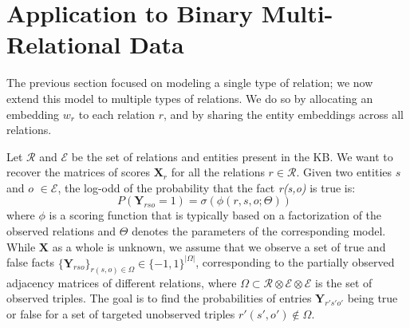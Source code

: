 \documentclass{article}
\newcommand{\OmegaSpace}{\Omega}
\newcommand{\proba}{P}
\renewcommand{\Re}{\mathbb{R}}
\newcommand{\R}{\Re} %
\newcommand{\Relation}{\mathbf{X}}
\newcommand{\ObsTensor}{\mathbf{Y}}
\newcommand{\EntitySpace}{\mathcal{E}}
\newcommand{\RelationSpace}{\mathcal{R}}
\newcommand{\Johans}[1]{\todo[inline,backgroundcolor=green!20!green]{Johans: #1}}
\begin{document}

\section{Application to Binary Multi-Relational Data}

The previous section focused on modeling a single type of relation; %
we now extend this model to multiple types of relations. 
We do so by allocating an embedding $w_r$ to each relation $r$, and by sharing the entity embeddings across all relations.

Let $\RelationSpace$ and $\EntitySpace$ be the set of relations and entities present in the KB. We want to recover the matrices of scores $\Relation_r$ for all the relations $r \in\RelationSpace$.
Given two entities $s$ and $o$ $ \in \EntitySpace$, the log-odd of the probability that the fact \emph{r(s,o)} is true is:
\begin{equation}
    \proba(\ObsTensor_{rso}=1) = \sigma(\phi(r,s,o;\Theta))\enspace
    \label{observation-model}
\end{equation}
where $\phi$ is a scoring function that is typically based on a factorization of the observed relations and $\Theta$ denotes the parameters of the corresponding model. While $\Relation$ as a whole is unknown, we 
assume that we observe a set of true and false facts 
$\{\ObsTensor_{rso}\}_{r(s,o)\in \OmegaSpace} \in \{-1,1\}^{|\OmegaSpace|}$, corresponding to the partially observed adjacency matrices of different relations, where $\OmegaSpace\subset\RelationSpace\otimes\EntitySpace\otimes\EntitySpace$ 
is the set of observed triples. The goal is to find the probabilities of entries 
$\ObsTensor_{r's'o'}$ being true or false for a set of targeted unobserved 
triples $r'(s',o')\notin\OmegaSpace$.
\end{document}
